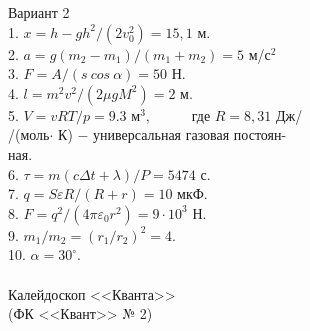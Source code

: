 
\noindent Вариант 2\\
1. $x=h-gh^2/(2v^2_0)=15,1$ м.\\
2. $a=g(m_2-m_1)/(m_1+m_2)=5$ м/с$^2$\\
3. $F=A/(s\ cos\ \alpha)=50$ Н.\\
4. $l=m^2v^2/(2\mu gM^2)=2$ м.\\
5. $V=vRT/p=9.3$ м$^3$,\ \ \ \ \ \ где $R=8,31$ Дж/\\ /(моль$\cdot$ К) $-$ универсальная газовая постоян-\\ ная.\\
6. $\tau=m(c\Delta t +\lambda)/P=5474$ с.\\
7. $q=S\varepsilon R/(R+r)=10$ мкФ.\\
8. $F=q^2/(4\pi \varepsilon_0 r^2)=9\cdot10^3$ Н.\\
9. $m_1/m_2=(r_1/r_2)^2=4$.\\
10. $\alpha=30^\circ$.\\ \\

\noindent Калейдоскоп <<Кванта>>\\
(ФК <<Квант>> № 2)\\

